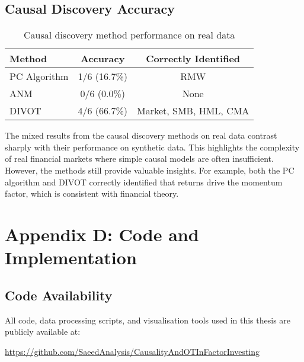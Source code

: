 \section*{Causal Discovery Accuracy}
\begin{table}[H]
    \centering
    \caption{Causal discovery method performance on real data}
    \begin{tabular}{|l|c|c|}
        \hline
        \textbf{Method} & \textbf{Accuracy} & \textbf{Correctly Identified} \\
        \hline
        PC Algorithm & 1/6 (16.7\%) & RMW \\
        ANM   & 0/6 (0.0\%) & None \\
        DIVOT & 4/6 (66.7\%) & Market, SMB, HML, CMA \\
        \hline
    \end{tabular}
\end{table}

\noindent
The mixed results from the causal discovery methods on real data contrast sharply with their performance on synthetic data. This highlights the complexity of real financial markets where simple causal models are often insufficient. However, the methods still provide valuable insights. For example, both the PC algorithm and DIVOT correctly identified that returns drive the momentum factor, which is consistent with financial theory.


\chapter{Appendix D: Code and Implementation}
\label{cha: Appendix D}

\section*{Code Availability}
All code, data processing scripts, and visualisation tools used in this thesis are publicly available at:

\begin{center}
\url{https://github.com/SaeedAnalysis/CausalityAndOTInFactorInvesting}
\end{center}

